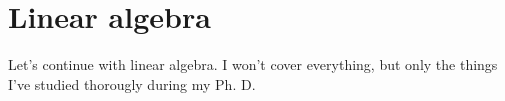 \section{Linear algebra}
    Let's continue with linear algebra. I won't cover everything, but only the things I've studied thorougly during my Ph. D.

    

    

    
